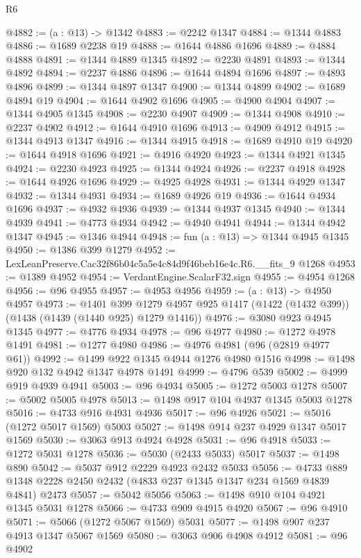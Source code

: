 \begin{lexlean}{R6}
\begin{coremodule}
@4882 := (a : @13) -> @1342
@4883 := @2242 @1347
@4884 := @1344 @4883
@4886 := @1689 @2238 @19
@4888 := @1644 @4886 @1696
@4889 := @4884 @4888
@4891 := @1344 @4889 @1345
@4892 := @2230 @4891
@4893 := @1344 @4892
@4894 := @2237 @4886
@4896 := @1644 @4894 @1696
@4897 := @4893 @4896
@4899 := @1344 @4897 @1347
@4900 := @1344 @4899
@4902 := @1689 @4894 @19
@4904 := @1644 @4902 @1696
@4905 := @4900 @4904
@4907 := @1344 @4905 @1345
@4908 := @2230 @4907
@4909 := @1344 @4908
@4910 := @2237 @4902
@4912 := @1644 @4910 @1696
@4913 := @4909 @4912
@4915 := @1344 @4913 @1347
@4916 := @1344 @4915
@4918 := @1689 @4910 @19
@4920 := @1644 @4918 @1696
@4921 := @4916 @4920
@4923 := @1344 @4921 @1345
@4924 := @2230 @4923
@4925 := @1344 @4924
@4926 := @2237 @4918
@4928 := @1644 @4926 @1696
@4929 := @4925 @4928
@4931 := @1344 @4929 @1347
@4932 := @1344 @4931
@4934 := @1689 @4926 @19
@4936 := @1644 @4934 @1696
@4937 := @4932 @4936
@4939 := @1344 @4937 @1345
@4940 := @1344 @4939
@4941 := @4773 @4934
@4942 := @4940 @4941
@4944 := @1344 @4942 @1347
@4945 := @1346 @4944
@4948 := fun (a : @13) => @1344 @4945 @1345
@4950 := @1386 @399 @1279
@4952 := LexLeanPreserve.Cac32f86b04c5a5e4c84d9f46beb16e4c.R6.__fits_9 @1268
@4953 := @1389 @4952
@4954 := VerdantEngine.ScalarF32.sign
@4955 := @4954 @1268
@4956 := @96 @4955
@4957 := @4953 @4956
@4959 := (a : @13) -> @4950 @4957
@4973 := @1401
    @399
    @1279
    @4957
    @925
    @1417
    (@1422 (@1432 @399))
    (@1438 (@1439 (@1440 @925) @1279 @1416))
@4976 := @3080 @923 @4945 @1345
@4977 := @4776 @4934
@4978 := @96 @4977
@4980 := @1272 @4978 @1491
@4981 := @1277 @4980
@4986 := @4976 @4981 (@96 (@2819 @4977 @61))
@4992 := @1499 @922 @1345 @4944 @1276 @4980 @1516
@4998 := @1498 @920 @132 @4942 @1347 @4978 @1491
@4999 := @4796 @539
@5002 := @4999 @919 @4939 @4941
@5003 := @96 @4934
@5005 := @1272 @5003 @1278
@5007 := @5002 @5005 @4978
@5013 := @1498 @917 @104 @4937 @1345 @5003 @1278
@5016 := @4733 @916 @4931 @4936
@5017 := @96 @4926
@5021 := @5016 (@1272 @5017 @1569) @5003
@5027 := @1498 @914 @237 @4929 @1347 @5017 @1569
@5030 := @3063 @913 @4924 @4928
@5031 := @96 @4918
@5033 := @1272 @5031 @1278
@5036 := @5030 (@2433 @5033) @5017
@5037 := @1498 @890
@5042 := @5037 @912 @2229 @4923 @2432 @5033
@5056 := @4733 @889 @1348 @2228 @2450 @2432 (@4833 @237 @1345 @1347 @234 @1569 @4839 @4841) @2473
@5057 := @5042 @5056
@5063 := @1498 @910 @104 @4921 @1345 @5031 @1278
@5066 := @4733 @909 @4915 @4920
@5067 := @96 @4910
@5071 := @5066 (@1272 @5067 @1569) @5031
@5077 := @1498 @907 @237 @4913 @1347 @5067 @1569
@5080 := @3063 @906 @4908 @4912
@5081 := @96 @4902

\end{coremodule}
\end{lexlean}
